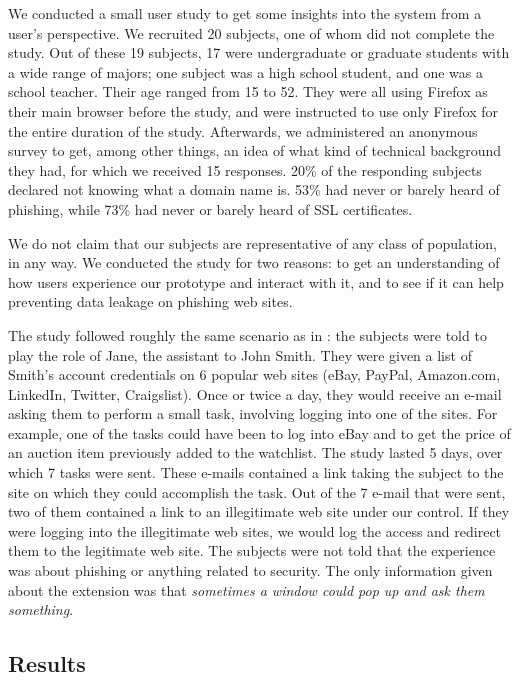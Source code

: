 \documentclass[11pt,styles/chicago,a4paper]{article}
\begin{document}
We conducted a small user study to get some insights into the system from a user's perspective. We recruited 20 subjects, one of whom did not complete the study. Out of these 19 subjects, 17 were undergraduate or graduate students with a wide range of majors; one subject was a high school student, and one was a school teacher. Their age ranged from 15 to 52. %
They were all using Firefox as their main browser before the study, and were instructed to use only Firefox for the entire duration of the study. Afterwards, we administered an anonymous survey to get, among other things, an idea of what kind of technical background they had, for which we received 15 responses. 20\% of the responding subjects declared not knowing what a domain name is. 53\% had never or barely heard of phishing, while 73\% had never or barely heard of SSL certificates.

We do not claim that our subjects are representative of any class of population, in any way. We conducted the study for two reasons: to get an understanding of how users experience our prototype and interact with it, and to see if it can help preventing data leakage on phishing web sites.

The study followed roughly the same scenario as in \cite{wu2006web}: the subjects were told to play the role of Jane, the assistant to John Smith. They were given a list of Smith's account credentials on 6 popular web sites (eBay, PayPal, Amazon.com, LinkedIn, Twitter, Craigslist). Once or twice a day, they would receive an e-mail asking them to perform a small task, involving logging into one of the sites. For example, one of the tasks could have been to log into eBay and to get the price of an auction item previously added to the watchlist. The study lasted 5 days, over which 7 tasks were sent. These e-mails contained a link taking the subject to the site on which they could accomplish the task. Out of the 7 e-mail that were sent, two of them contained a link to an illegitimate web site under our control. If they were logging into the illegitimate web sites, we would log the access and redirect them to the legitimate web site. The subjects were not told that the experience was about phishing or anything related to security. The only information given about the extension was that \emph{sometimes a window could pop up and ask them something}.

\subsection{Results}
\end{document}
